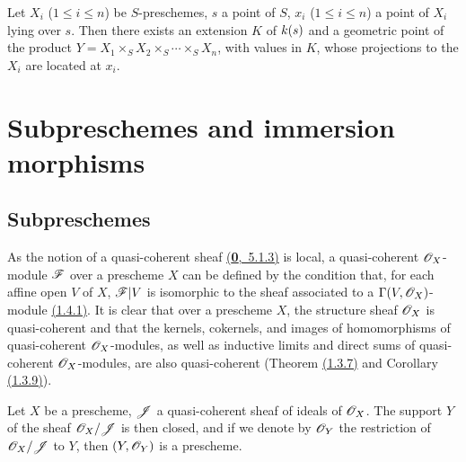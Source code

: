 \begin{lem}[3.4.6]
\label{lem-1.3.4.6}
Let $X_i$ ($1\leqslant i\leqslant n$) be $S$-preschemes, $s$ a point of $S$, $x_i$
($1\leqslant i\leqslant n$) a point of $X_i$ lying over $s$. Then there exists an extension
$K$ of $k(s)$ and a geometric point of the product
$Y=X_1\times_S X_2\times_S\cdots\times_S X_n$, with values in $K$, whose projections to
the $X_i$ are located at $x_i$.
\end{lem}

\section{Subpreschemes and immersion morphisms}
\label{section-subpreschemes-and-immersion-morphisms}

\subsection{Subpreschemes}
\label{subsection-subpreschemes}

\begin{env}[4.1.1]
\label{env-1.4.1.1}
As the notion of a quasi-coherent sheaf \hyperref[env-0.5.1.3]{(\textbf{0},~5.1.3)} is local,
a quasi-coherent $\mathscr{O}_X$-module $\mathscr{F}$ over a prescheme $X$ can be defined by the condition
that, for each affine open $V$ of $X$, $\mathscr{F}|V$ is isomorphic to the sheaf associated to a
$\Gamma(V,\mathscr{O}_X)$-module \hyperref[thm-1.1.4.1]{(1.4.1)}. It is clear that over a prescheme
$X$, the structure sheaf $\mathscr{O}_X$ is quasi-coherent and that the kernels, cokernels, and
images of homomorphisms of quasi-coherent $\mathscr{O}_X$-modules, as well as inductive limits and
direct sums of quasi-coherent $\mathscr{O}_X$-modules, are also quasi-coherent
(Theorem \hyperref[thm-1.1.3.7]{(1.3.7)} and Corollary \hyperref[cor-1.1.3.9]{(1.3.9)}).
\end{env}

\begin{prop}[4.1.2]
\label{prop-1.4.1.2}
Let $X$ be a prescheme, $\mathscr{J}$ a quasi-coherent sheaf of ideals of $\mathscr{O}_X$. The support
$Y$ of the sheaf $\mathscr{O}_X/\mathscr{J}$ is then closed, and if we denote by $\mathscr{O}_Y$ the restriction
of $\mathscr{O}_X/\mathscr{J}$ to $Y$, then $(Y,\mathscr{O}_Y)$ is a prescheme.
\end{prop}

